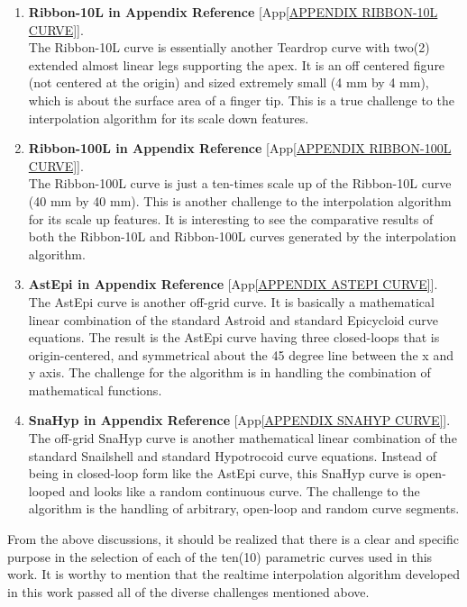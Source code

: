 \begin{enumerate}
    \item \textbf{Ribbon-10L in Appendix Reference} [App\ref{APPENDIX RIBBON-10L CURVE}]. \\ 
    The Ribbon-10L curve is essentially another Teardrop curve with two(2) extended almost linear legs supporting the apex. It is an off centered figure (not centered at the origin) and sized extremely small (4 mm by 4 mm), which is about the surface area of a finger tip. This is a true challenge to the interpolation algorithm for its scale down features. 

	\item \textbf{Ribbon-100L in Appendix Reference} [App\ref{APPENDIX RIBBON-100L CURVE}]. \\ 
    The Ribbon-100L curve is just a ten-times scale up of the Ribbon-10L curve (40 mm by 40 mm). This is another challenge to the interpolation algorithm for its scale up features. It is interesting to see the comparative results of both the Ribbon-10L and Ribbon-100L curves generated by the interpolation algorithm.

\clearpage
\pagebreak

	\item \textbf{AstEpi in Appendix Reference} [App\ref{APPENDIX ASTEPI CURVE}]. \\ 
    The AstEpi curve is another off-grid curve. It is basically a mathematical linear combination of the standard Astroid and standard Epicycloid curve equations. The result is the AstEpi curve having three closed-loops that is origin-centered, and symmetrical about the 45 degree line between the x and y axis. The challenge for the algorithm is in handling the combination of mathematical functions. 

	\item \textbf{SnaHyp in Appendix Reference} [App\ref{APPENDIX SNAHYP CURVE}]. \\ 
    The off-grid SnaHyp curve is another mathematical linear combination of the standard Snailshell and standard Hypotrocoid curve equations. Instead of being in closed-loop form like the AstEpi curve, this SnaHyp curve is open-looped and looks like a random continuous curve. The challenge to the algorithm is the handling of arbitrary, open-loop and random curve segments.
	
\end{enumerate}

From the above discussions, it should be realized that there is a clear and specific purpose in the selection of each of the ten(10) parametric curves used in this work. It is worthy to mention that the realtime interpolation algorithm developed in this work passed all of the diverse challenges mentioned above.  


